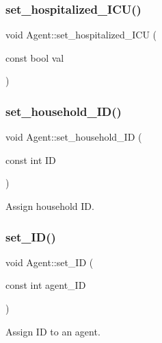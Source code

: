 \subsubsection{\texorpdfstring{set\+\_\+hospitalized\+\_\+\+I\+C\+U()}{set\_hospitalized\_ICU()}}
{\footnotesize\ttfamily void Agent\+::set\+\_\+hospitalized\+\_\+\+I\+CU (\begin{DoxyParamCaption}\item[{const bool}]{val }\end{DoxyParamCaption})\hspace{0.3cm}{\ttfamily [inline]}}

\mbox{\label{classAgent_a2b889b74bbe8a1c8754c3211892a761b}} 
\subsubsection{\texorpdfstring{set\+\_\+household\+\_\+\+I\+D()}{set\_household\_ID()}}
{\footnotesize\ttfamily void Agent\+::set\+\_\+household\+\_\+\+ID (\begin{DoxyParamCaption}\item[{const int}]{ID }\end{DoxyParamCaption})\hspace{0.3cm}{\ttfamily [inline]}}



Assign household ID. 

\mbox{\label{classAgent_a2820049e7b8d498e5fb5047ca2a05d63}} 
\subsubsection{\texorpdfstring{set\+\_\+\+I\+D()}{set\_ID()}}
{\footnotesize\ttfamily void Agent\+::set\+\_\+\+ID (\begin{DoxyParamCaption}\item[{const int}]{agent\+\_\+\+ID }\end{DoxyParamCaption})\hspace{0.3cm}{\ttfamily [inline]}}



Assign ID to an agent. 

\mbox{\label{classAgent_a8903c8e72857920e75be99f103b90ee5}} 
